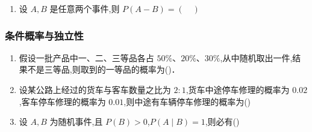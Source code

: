 \begin{enumerate}
    \item  设 $A,B$ 是任意两个事件,则 $P(A-B)=(\quad)$
\end{enumerate}

\subsubsection{条件概率与独立性}

\begin{enumerate}
  \item  假设一批产品中一、二、三等品各占 $50\%$、$20\%$、$30\%$,从中随机取出一件,结果不是三等品,则取到的一等品的概率为(\quad)．

  \item  设某公路上经过的货车与客车数量之比为 $2:1$,货车中途停车修理的概率为 $0.02$,客车停车修理的概率为 $0.01$,则中途有车辆停车修理的概率为(\quad)

  \item  设 $A,B$ 为随机事件,且 $P(B)>0$,$P(A\mid B)=1$,则必有(\quad)


\end{enumerate}
